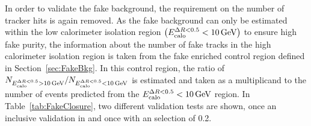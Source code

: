 In order to validate the fake background, the requirement on the number of tracker hits is again removed.
As the fake background can only be estimated within the low calorimeter isolation region $\left(E^{\Delta R<0.5}_{\text{calo}}<10\,\text{Ge}\kern-0.06667em\text{V}\right)$ to ensure high fake purity, 
the information about the number of fake tracks in the high calorimeter isolation region is taken from the fake enriched control region \fakeCR defined in Section~\ref{sec:FakeBkg}.
In this control region, the ratio of $N_{E^{\Delta R<0.5}_{\text{calo}}>10\,\text{Ge}\kern-0.06667em\text{V}}/N_{E^{\Delta R<0.5}_{\text{calo}}<10\,\text{Ge}\kern-0.06667em\text{V}}$ is estimated and taken as a multiplicand to the number of events predicted from the $E^{\Delta R<0.5}_{\text{calo}}<10\,\text{Ge}\kern-0.06667em\text{V}$ region.
In Table~\ref{tab:FakeClosure}, two different validation tests are shown, once an inclusive validation in \ias and once with an \ias selection of 0.2.
\renewcommand{\arraystretch}{1.5}
\begin{table}[!b]
\centering
\caption{Validation test of fake and leptonic background estimation methods (only statistical uncertainties are included). Left: $\ecalo>10\gev$ . Right: $\ecalo>10\gev$ and $\ias>0.2$}
\label{tab:FakeClosure}
\end{table}
